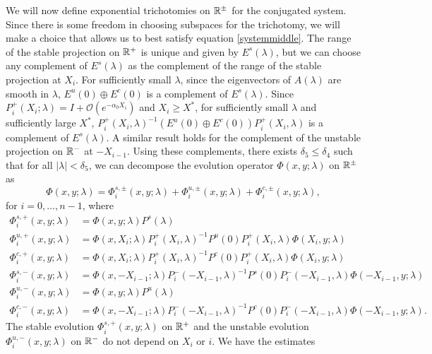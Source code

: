 \documentclass[10pt,reqno]{amsart}
\theoremstyle{plain}
\theoremstyle{definition}
\theoremstyle{remark}
\numberwithin{theorem}{section}
\numberwithin{equation}{section}
\begin{document}
We will now define exponential trichotomies on $\mathbb{R}^\pm$ for the conjugated system. Since there is some freedom in choosing subspaces for the trichotomy, we will make a choice that allows us to best satisfy equation \cref{systemmiddle}. The range of the stable projection on $\mathbb{R}^+$ is unique and given by $E^s(\lambda)$, but we can choose any complement of $E^s(\lambda)$ as the complement of the range of the stable projection at $X_i$. For sufficiently small $\lambda$, since the eigenvectors of $A(\lambda)$ are smooth in $\lambda$, $E^u(0)\oplus E^c(0)$ is a complement of $E^s(\lambda)$. Since $P_i^+(X_i; \lambda) = I + \mathcal{O}(e^{-\alpha_0 X_i})$ and $X_i \geq X^*$, for sufficiently small $\lambda$ and sufficiently large $X^*$, $P_i^+(X_i, \lambda)^{-1} ( E^u(0)\oplus E^c(0) ) P_i^+(X_i, \lambda)$ is a complement of $E^s(\lambda)$. A similar result holds for the complement of the unstable projection on $\mathbb{R}^-$ at $-X_{i-1}$. Using these complements, there exists $\delta_5 \leq \delta_4$ such that for all $|\lambda| < \delta_5$, we can decompose the evolution operator $\Phi(x,y; \lambda)$ on $\mathbb{R}^\pm$ as
\begin{equation}\label{Phidecomp}
\Phi(x, y; \lambda) = \Phi_i^{s,\pm}(x, y; \lambda) + \Phi_i^{u,\pm}(x, y; \lambda) + \Phi_i^{c,\pm}(x, y; \lambda),
\end{equation}
for $i = 0, \dots, n-1$, where
\begin{equation}\label{Zevolmod}
\begin{aligned}
\Phi_i^{s,+}(x, y; \lambda) &= \Phi(x, y; \lambda) P^s(\lambda) \\
\Phi_i^{u,+}(x, y; \lambda) &= \Phi(x, X_i; \lambda) P_i^+(X_i, \lambda)^{-1}
P^u(0) P_i^+(X_i, \lambda) \Phi(X_i, y; \lambda) \\
\Phi_i^{c,+}(x, y; \lambda) &= \Phi(x, X_i; \lambda) P_i^+(X_i, \lambda)^{-1}
P^c(0) P_i^+(X_i, \lambda) \Phi(X_i, y; \lambda)  \\
\Phi_i^{s,-}(x, y; \lambda) &= \Phi(x, -X_{i-1}; \lambda) P_i^-(-X_{i-1}, \lambda)^{-1}
P^s(0) P_i^-(-X_{i-1}, \lambda) \Phi(-X_{i-1}, y; \lambda) \\
\Phi_i^{u,-}(x, y; \lambda) &= \Phi(x, y; \lambda) P^u(\lambda) \\
\Phi_i^{c,-}(x, y; \lambda) &= \Phi(x, -X_{i-1}; \lambda) P_i^-(-X_{i-1}, \lambda)^{-1}
P^c(0) P_i^-(-X_{i-1}, \lambda) \Phi(-X_{i-1}, y; \lambda).
\end{aligned}
\end{equation}
The stable evolution $\Phi_i^{s,+}(x, y; \lambda)$ on $\mathbb{R}^+$ and the unstable evolution $\Phi_i^{u,-}(x, y; \lambda)$ on $\mathbb{R}^-$ do not depend on $X_i$ or $i$. We have the estimates
\end{document}
